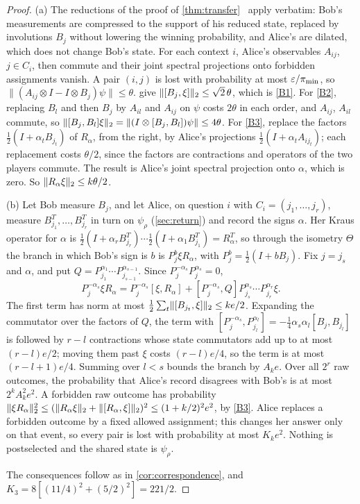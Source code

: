 \begin{proof}
(a) The reductions of the proof of \cref{thm:transfer}~\cite[proof of Theorem~5.1, Step~1]{DM-game} apply verbatim: Bob's
measurements are compressed to the support of his reduced state, replaced by involutions $B_j$ without lowering the winning
probability, and Alice's are dilated, which does not change Bob's state. For each context $i$, Alice's observables $A_{ij}$, $j\in C_i$, then commute and their joint
spectral projections onto forbidden assignments vanish. A pair $(i,j)$ is lost with probability at most
$\varepsilon/\pi_{\min}$, so $\lVert(A_{ij}\otimes I-I\otimes B_j)\psi\rVert\le\theta$.  give
$\lVert [B_j,\xi]\rVert_2\le\sqrt2\,\theta$, which is \ref{B1}. For \ref{B2}, replacing $B_l$ and then $B_j$ by $A_{il}$ and $A_{ij}$ on
$\psi$ costs $2\theta$ in each order, and $A_{ij}$, $A_{il}$ commute, so $\lVert [B_j,B_l]\xi\rVert_2=\lVert(I\otimes[B_j,B_l])\psi\rVert\le4\theta$.
For \ref{B3}, replace the factors $\frac12(I+\alpha_tB_{j_t})$ of $R_\alpha$, from the right, by Alice's projections
$\frac12(I+\alpha_tA_{ij_t})$; each replacement costs $\theta/2$, since the factors are contractions and operators of the two
players commute. The result is Alice's joint spectral projection onto $\alpha$, which is zero. So
$\lVert R_\alpha\xi\rVert_2\le k\theta/2$.

(b) Let Bob measure $B_j$, and let Alice, on question $i$ with $C_i=(j_1,\dots,j_r)$, measure $B_{j_1}^T,\dots,B_{j_r}^T$ in
turn on $\psi_\rho$ (\cref{sec:return}) and record the signs $\alpha$. Her Kraus operator for $\alpha$ is
$\frac12(I+\alpha_rB_{j_r}^T)\cdots\frac12(I+\alpha_1B_{j_1}^T)=R_\alpha^T$, so through the isometry $\Theta$ the branch in which
Bob's sign is $b$ is $P^b_j\xi R_\alpha$, with $P^b_j=\frac12(I+bB_j)$. Fix $j=j_s$ and $\alpha$, and put
$Q=P^{\alpha_1}_{j_1}\cdots P^{\alpha_{s-1}}_{j_{s-1}}$. Since $P^{-\alpha_s}_jP^{\alpha_s}_j=0$,
\[
P^{-\alpha_s}_j\xi R_\alpha=P^{-\alpha_s}_j[\xi,R_\alpha]+[P^{-\alpha_s}_j,Q]P^{\alpha_s}_{j_s}\cdots P^{\alpha_r}_{j_r}\xi .
\]
The first term has norm at most $\frac12\sum_t\lVert [B_{j_t},\xi]\rVert_2\le ke/2$. Expanding the commutator over the factors of $Q$,
the term with $[P^{-\alpha_s}_j,P^{\alpha_l}_{j_l}]=-\frac14\alpha_s\alpha_l[B_j,B_{j_l}]$ is followed by $r-l$ contractions whose
state commutators add up to at most $(r-l)e/2$; moving them past $\xi$ costs $(r-l)e/4$, so the term is at most
$(r-l+1)e/4$. Summing over $l<s$ bounds the branch by $A_ke$. Over all $2^r$ raw outcomes, the probability that Alice's
record disagrees with Bob's is at most $2^kA_k^2e^2$. A forbidden raw outcome has probability
$\lVert \xi R_\alpha\rVert_2^2\le(\lVert R_\alpha\xi\rVert_2+\lVert [R_\alpha,\xi]\rVert_2)^2\le(1+k/2)^2e^2$, by \ref{B3}. Alice replaces a forbidden outcome by
a fixed allowed assignment; this changes her answer only on that event, so every pair is lost with probability at most
$K_ke^2$. Nothing is postselected and the shared state is $\psi_\rho$.

The consequences follow as in \cref{cor:correspondence}, and $K_3=8[(11/4)^2+(5/2)^2]=221/2$.
\end{proof}

